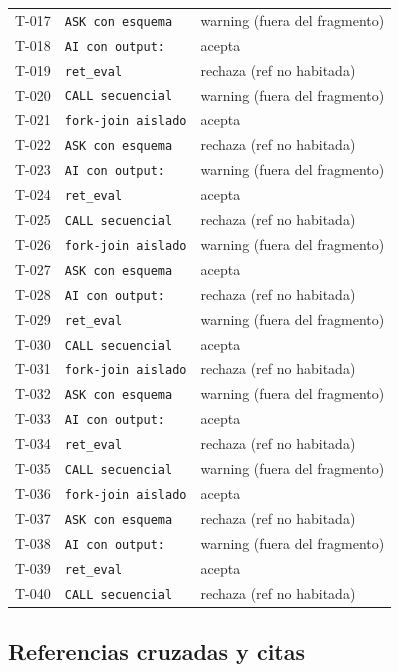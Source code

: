 \begin{longtable}{@{}l l l@{}}
  T-017 & \texttt{ASK con esquema} & warning (fuera del fragmento) \\
  T-018 & \texttt{AI con output:} & acepta \\
  T-019 & \texttt{ret\_eval} & rechaza (ref no habitada) \\
  T-020 & \texttt{CALL secuencial} & warning (fuera del fragmento) \\
  T-021 & \texttt{fork-join aislado} & acepta \\
  T-022 & \texttt{ASK con esquema} & rechaza (ref no habitada) \\
  T-023 & \texttt{AI con output:} & warning (fuera del fragmento) \\
  T-024 & \texttt{ret\_eval} & acepta \\
  T-025 & \texttt{CALL secuencial} & rechaza (ref no habitada) \\
  T-026 & \texttt{fork-join aislado} & warning (fuera del fragmento) \\
  T-027 & \texttt{ASK con esquema} & acepta \\
  T-028 & \texttt{AI con output:} & rechaza (ref no habitada) \\
  T-029 & \texttt{ret\_eval} & warning (fuera del fragmento) \\
  T-030 & \texttt{CALL secuencial} & acepta \\
  T-031 & \texttt{fork-join aislado} & rechaza (ref no habitada) \\
  T-032 & \texttt{ASK con esquema} & warning (fuera del fragmento) \\
  T-033 & \texttt{AI con output:} & acepta \\
  T-034 & \texttt{ret\_eval} & rechaza (ref no habitada) \\
  T-035 & \texttt{CALL secuencial} & warning (fuera del fragmento) \\
  T-036 & \texttt{fork-join aislado} & acepta \\
  T-037 & \texttt{ASK con esquema} & rechaza (ref no habitada) \\
  T-038 & \texttt{AI con output:} & warning (fuera del fragmento) \\
  T-039 & \texttt{ret\_eval} & acepta \\
  T-040 & \texttt{CALL secuencial} & rechaza (ref no habitada) \\
\end{longtable}

\subsection{Referencias cruzadas y citas}


